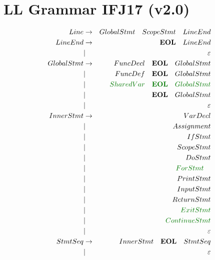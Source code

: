 \documentclass[a4paper,11pt,landscape,leqno]{article}
\begin{document}
\section{LL Grammar IFJ17 (v2.0)}
\begin{eqnarray}
Line		&	\rightarrow		& GlobalStmt\quad ScopeStmt\quad  LineEnd	 \\
LineEnd		& \rightarrow		& \textbf{EOL}\quad LineEnd\\
			&		|			& \varepsilon		  \\
GlobalStmt	&	\rightarrow		&  FuncDecl\quad \textbf{EOL}\quad GlobalStmt	 \\
			&		|			& FuncDef\quad \textbf{EOL}\quad GlobalStmt    \\
			&		|			& \textcolor{green1}{SharedVar\quad \textbf{EOL}\quad GlobalStmt}	 \\
			&		|			& \textbf{EOL}\quad GlobalStmt\\
			&		|			& \varepsilon \\
InnerStmt	&	\rightarrow		& VarDecl  \\
			&		|			& Assignment	\\
			&		|			& IfStmt	\\
			&		|			& ScopeStmt   \\
			&		|			& DoStmt  \\
			&		|			& \textcolor{green1}{ForStmt}\quad	\\
			&		|			& PrintStmt \\
			&		|			& InputStmt  \\
			&		|			& ReturnStmt  \\
			&		|			& \textcolor{green1}{ExitStmt}	\\
			&		|			& \textcolor{green1}{ContinueStmt}	\\
			&		|			& \varepsilon \\
StmtSeq		&	 \rightarrow	& InnerStmt\quad \textbf{EOL}\quad StmtSeq	 \\
			&		|			& \varepsilon \\

\end{eqnarray}
\end{document}

